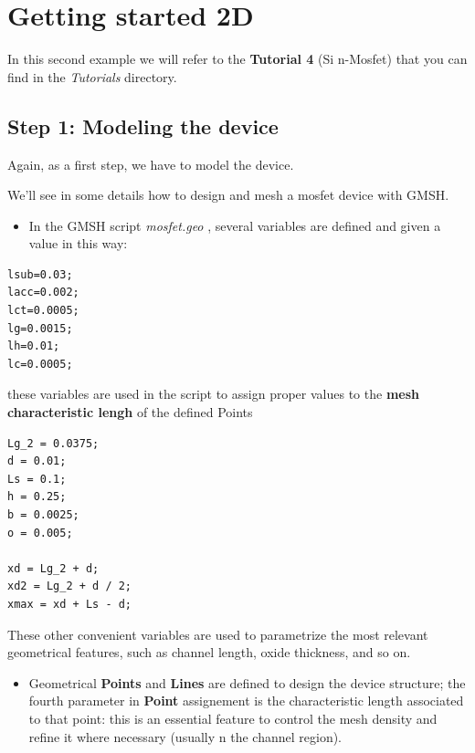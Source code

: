 



%
%
%
%




\chapter{Getting  started 2D}


In this  second  example  we  will  refer  to  the  \textbf{Tutorial 4} (Si n-Mosfet) that you  can  find  in  the  \textit{Tutorials}  directory.



\section*{Step 1: Modeling the device}

Again, as a first step, we have to model the device. 

We'll see in some details how to design and mesh a mosfet device with GMSH.


\begin{itemize}
\item 
In the  GMSH script  \textit{mosfet.geo} , several variables are  defined and given a value in this way:                                                 \end{itemize}


\begin{verbatim}
lsub=0.03;
lacc=0.002;
lct=0.0005;
lg=0.0015;
lh=0.01;
lc=0.0005;
\end{verbatim}

these variables are used in the script to assign proper values to the \textbf{mesh characteristic lengh} of the defined Points 

\begin{verbatim}
Lg_2 = 0.0375;
d = 0.01;
Ls = 0.1;
h = 0.25;
b = 0.0025;
o = 0.005;

xd = Lg_2 + d;
xd2 = Lg_2 + d / 2;
xmax = xd + Ls - d;
\end{verbatim}
These other convenient variables are used to parametrize the most relevant geometrical features, such as channel length, oxide thickness,  and  so on. 


\begin{itemize}
\item 
Geometrical \textbf{Points} and \textbf{Lines} are  defined to design the device  structure; the  fourth parameter in \textbf{Point} assignement is  the   characteristic length associated to that point: this  is  an  essential feature to control the  mesh density and refine it where  necessary (usually n the channel region).   
  \end{itemize}

